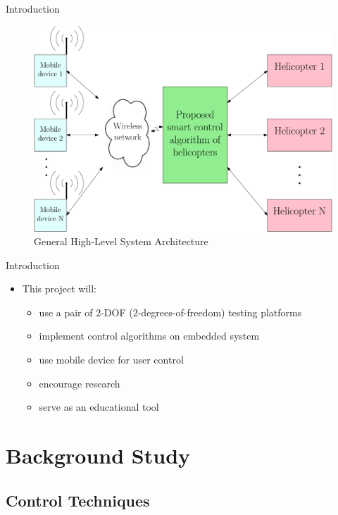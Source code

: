 \documentclass{beamer}
\begin{document}
\begin{frame}{Introduction}{}
\begin{figure}
  \centering
  \includegraphics[scale=0.31]{figs/ipe/highLevel_wht_grn}
  \caption{General High-Level System Architecture}
  \label{fig:ProblemStatementImage}
\end{figure}
\end{frame}

\begin{frame}{Introduction}{}
        \begin{itemize}
        \item This project will:
            \begin{itemize}
                \item use a pair of 2-DOF (2-degrees-of-freedom) testing platforms
                \item implement control algorithms on embedded system
                \item use mobile device for user control
                \item encourage research
                \item serve as an educational tool
            \end{itemize}
        \end{itemize}
\end{frame}


\section{Background Study}

\subsection{Control Techniques}
\end{document}
